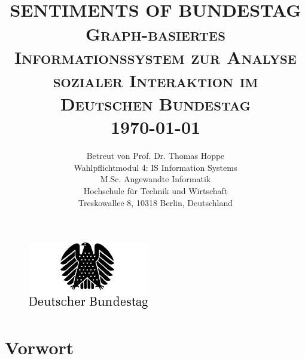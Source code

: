 \documentclass[a4paper,12pt,twoside]{book}
\title{
\HRule{0.5pt} \\
\LARGE \textbf{\uppercase{Sentiments of Bundestag}}
\HRule{2pt} \\ [0.5cm]
\normalsize \textsc{Graph-basiertes Informationssystem zur Analyse sozialer Interaktion im Deutschen Bundestag}
\\[2.0cm]
\normalsize \today
}
\author{
\normalsize Betreut von
\normalsize Prof. Dr. Thomas Hoppe\\
\normalsize Wahlpflichtmodul 4: IS Information Systems\\
\normalsize M.Sc. Angewandte Informatik\\
\normalsize Hochschule für Technik und Wirtschaft\\
\normalsize Treskowallee 8, 10318 Berlin, Deutschland\\
}
\makeatletter
\def\printtitle{	
    {\centering \@title\par}}
\def\printauthor{
    {\centering \large \@author}}
\makeatother
\begin{document}
\thispagestyle{empty}
\printtitle
  	\vfill
\begin{figure}[H]
    \centering
    \includegraphics[width=200px, keepaspectratio]{logos/bundestag.png}
\end{figure}
  	\vfill
\printauthor		
\newpage

\setcounter{page}{3}

\setcounter{tocdepth}{2}
\tableofcontents

\listoffigures

\listoftables

\setcounter{page}{6}

\chapter{Vorwort}


\end{document}
